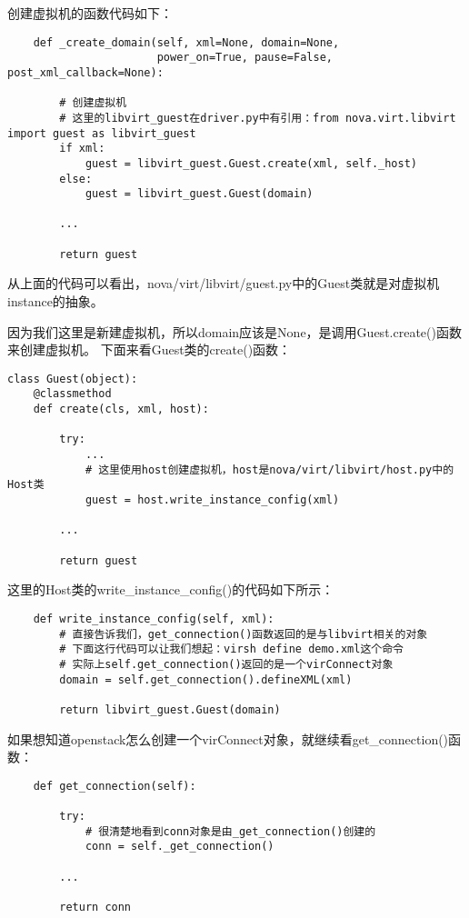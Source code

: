 \documentclass[a4paper,left=1.5cm,right=1.5cm,11pt]{article}
\begin{document}
	创建虚拟机的函数代码如下：
	\begin{lstlisting}
	def _create_domain(self, xml=None, domain=None,
                       power_on=True, pause=False, post_xml_callback=None):
		
		# 创建虚拟机
		# 这里的libvirt_guest在driver.py中有引用：from nova.virt.libvirt import guest as libvirt_guest
        if xml:
            guest = libvirt_guest.Guest.create(xml, self._host)
        else:
            guest = libvirt_guest.Guest(domain)

        ...

        return guest
	\end{lstlisting}

	从上面的代码可以看出，nova/virt/libvirt/guest.py中的Guest类就是对虚拟机instance的抽象。\par

	因为我们这里是新建虚拟机，所以domain应该是None，是调用Guest.create()函数来创建虚拟机。
	下面来看Guest类的create()函数：
	\begin{lstlisting}
class Guest(object):
	@classmethod
    def create(cls, xml, host):
        
        try:
            ...
			# 这里使用host创建虚拟机，host是nova/virt/libvirt/host.py中的Host类
            guest = host.write_instance_config(xml)
        
		...

        return guest
	\end{lstlisting}

	这里的Host类的write\_instance\_config()的代码如下所示：
	\begin{lstlisting}
	def write_instance_config(self, xml):
		# 直接告诉我们，get_connection()函数返回的是与libvirt相关的对象
		# 下面这行代码可以让我们想起：virsh define demo.xml这个命令
		# 实际上self.get_connection()返回的是一个virConnect对象
        domain = self.get_connection().defineXML(xml)

        return libvirt_guest.Guest(domain)
	\end{lstlisting}

	如果想知道openstack怎么创建一个virConnect对象，就继续看get\_connection()函数：
	\begin{lstlisting}
	def get_connection(self):
        
        try:
			# 很清楚地看到conn对象是由_get_connection()创建的
            conn = self._get_connection()
        
		...

        return conn
	\end{lstlisting}
\end{document}

